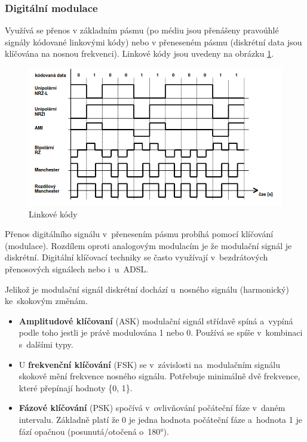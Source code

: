 \subsubsection{Digitální modulace}
Využívá se přenos v základním pásmu (po médiu jsou přenášeny pravoúhlé signály kódované linkovými kódy) nebo v přeneseném pásmu (diskrétní data jsou klíčována na nosnou frekvenci). Linkové kódy jsou uvedeny na obrázku \ref{fig:linkove_kody}.
\begin{figure}[htb]
    \centering
    \includegraphics[width=\textwidth]{images/q05_link_codes.png}
    \caption{Linkové kódy}
    \label{fig:linkove_kody}
\end{figure}

Přenos digitálního signálu v~přenesením pásmu probíhá pomocí klíčování (modulace). Rozdílem oproti analogovým modulacím je že modulační signál je diskrétní. Digitální klíčovací techniky se často využívají v~bezdrátových přenosových signálech nebo i~u~ADSL.

Jelikož je modulační signál diskrétní dochází u~nosného signálu (harmonický) ke~skokovým změnám.

\begin{itemize}[noitemsep]
    \item \textbf{Amplitudové klíčovaní} (ASK) modulační signál střídavě spíná a~vypíná podle toho jestli je právě modulována 1 nebo 0. Používá se spíše v~kombinaci s~dalšími typy.
    \item U \textbf{frekvenční klíčování} (FSK) se v~závislosti na~modulačním signálu skokově mění frekvence nosného signálu. Potřebuje minimálně dvě frekvence, které přepínají hodnoty \{0, 1\}.
    \item \textbf{Fázové klíčování} (PSK) spočívá v~ovlivňování počáteční fáze v~daném intervalu. Základně platí že 0 je jedna hodnota počáteční fáze a~hodnota 1 je fází opačnou (posunutá/otočená o~180°).
\end{itemize}

